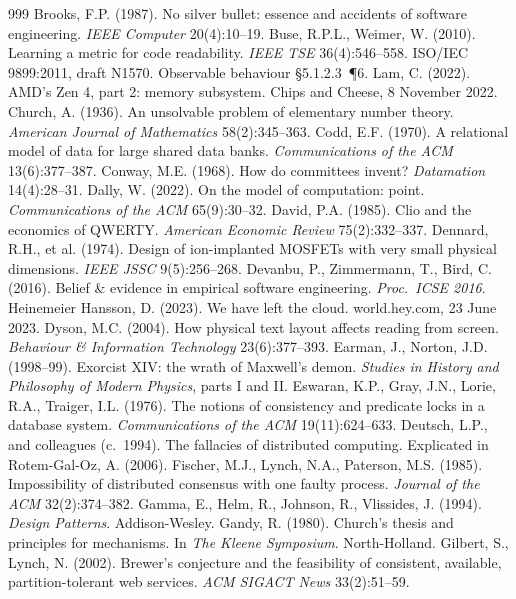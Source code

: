 \documentclass[11pt,oneside]{article}
\theoremstyle{definition}
\theoremstyle{remark}
\begin{document}
\begin{thebibliography}{999}
 Brooks, F.P. (1987). No silver bullet: essence and accidents of software engineering. \emph{IEEE Computer} 20(4):10--19.
 Buse, R.P.L., Weimer, W. (2010). Learning a metric for code readability. \emph{IEEE TSE} 36(4):546--558.
 ISO/IEC 9899:2011, draft N1570. Observable behaviour \S5.1.2.3~\P6.
 Lam, C. (2022). AMD's Zen 4, part 2: memory subsystem. Chips and Cheese, 8 November 2022.
 Church, A. (1936). An unsolvable problem of elementary number theory. \emph{American Journal of Mathematics} 58(2):345--363.
 Codd, E.F. (1970). A relational model of data for large shared data banks. \emph{Communications of the ACM} 13(6):377--387.
 Conway, M.E. (1968). How do committees invent? \emph{Datamation} 14(4):28--31.
 Dally, W. (2022). On the model of computation: point. \emph{Communications of the ACM} 65(9):30--32.
 David, P.A. (1985). Clio and the economics of QWERTY. \emph{American Economic Review} 75(2):332--337.
 Dennard, R.H., et al. (1974). Design of ion-implanted MOSFETs with very small physical dimensions. \emph{IEEE JSSC} 9(5):256--268.
 Devanbu, P., Zimmermann, T., Bird, C. (2016). Belief \& evidence in empirical software engineering. \emph{Proc.\ ICSE 2016}.
 Heinemeier Hansson, D. (2023). We have left the cloud. world.hey.com, 23 June 2023.
 Dyson, M.C. (2004). How physical text layout affects reading from screen. \emph{Behaviour \& Information Technology} 23(6):377--393.
 Earman, J., Norton, J.D. (1998--99). Exorcist XIV: the wrath of Maxwell's demon. \emph{Studies in History and Philosophy of Modern Physics}, parts I and II.
 Eswaran, K.P., Gray, J.N., Lorie, R.A., Traiger, I.L. (1976). The notions of consistency and predicate locks in a database system. \emph{Communications of the ACM} 19(11):624--633.
 Deutsch, L.P., and colleagues (c.~1994). The fallacies of distributed computing. Explicated in Rotem-Gal-Oz, A. (2006).
 Fischer, M.J., Lynch, N.A., Paterson, M.S. (1985). Impossibility of distributed consensus with one faulty process. \emph{Journal of the ACM} 32(2):374--382.
 Gamma, E., Helm, R., Johnson, R., Vlissides, J. (1994). \emph{Design Patterns}. Addison-Wesley.
 Gandy, R. (1980). Church's thesis and principles for mechanisms. In \emph{The Kleene Symposium}. North-Holland.
 Gilbert, S., Lynch, N. (2002). Brewer's conjecture and the feasibility of consistent, available, partition-tolerant web services. \emph{ACM SIGACT News} 33(2):51--59.

\end{thebibliography}
\end{document}
